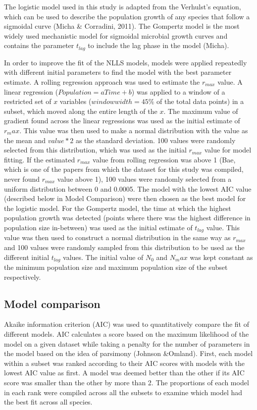 \documentclass[11pt, a4paper]{article}
\begin{document}
The logistic model used in this study is adapted from the Verhulst’s equation, which can be used to describe the population growth of any species that follow a sigmoidal curve (Micha & Corradini, 2011). The Gompertz model is the most widely used mechanistic model for sigmoidal microbial growth curves and contains the parameter $t_{lag}$ to include the lag phase in the model (Micha).\par

In order to improve the fit of the NLLS models, models were applied repeatedly with different initial parameters to find the model with the best parameter estimate. A rolling regression approach was used to estimate the $r_{max}$ value. A linear regression ($Population = a Time + b$) was applied to a window of a restricted set of $x$ variables ($window width = 45\%$ of the total data points) in a subset, which moved along the entire length of the $x$. The maximum value of gradient found across the linear regressions was used as the initial estimate of $r_max$. This value was then used to make a normal distribution with the value as the mean and $value*2$ as the standard deviation. 100 values were randomly selected from this distribution, which was used as the initial $r_{max}$ value for model fitting. If the estimated $r_{max}$ value from rolling regression was above 1 (Bae, which is one of the papers from which the dataset for this study was compiled, never found $r_{max}$ value above 1), 100 values were randomly selected from a uniform distribution between 0 and 0.0005. The model with the lowest AIC value (described below in Model Comparison) were then chosen as the best model for the logistic model. For the Gompertz model, the time at which the highest population growth was detected (points where there was the highest difference in population size in-between) was used as the initial estimate of $t_{lag}$ value. This value was then used to construct a normal distribution in the same way as $r_{max}$ and 100 values were randomly sampled from this distribution to be used as the different initial $t_{lag}$ values. The initial value of $N_0$ and $N_max$ was kept constant as the minimum population size and maximum population size of the subset respectively. \par

\subsection{Model comparison}
Akaike information criterion (AIC) was used to quantitatively compare the fit of different models. AIC calculates a score based on the maximum likelihood of the model on a given dataset while taking a penalty for the number of parameters in the model based on the idea of parsimony (Johnson &Omland). First, each model within a subset was ranked according to their AIC scores with models with the lowest AIC value as first. A model was deemed better than the other if its AIC score  was smaller than the other by more than 2. The proportions of each model in each rank were compiled across all the subsets to examine which model had the best fit across all species. \par
\end{document}
